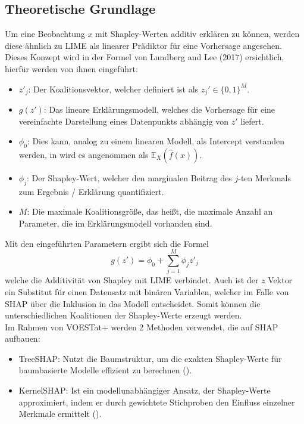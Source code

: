 \documentclass[12pt,titlepage,oneside]{book}
\begin{document}
\subsection*{Theoretische Grundlage}
Um eine Beobachtung $x$ mit Shapley-Werten additiv erklären zu können, werden diese ähnlich zu LIME als linearer Prädiktor für eine Vorhersage angesehen. Dieses Konzept wird in der Formel von Lundberg and Lee (2017) ersichtlich, hierfür werden von ihnen eingeführt:
\begin{itemize}
    \item $z'_j$: Der Koalitionsvektor, welcher definiert ist als $z_j' \in \{0, 1\}^M$.
    \item $g(z')$: Das lineare Erklärungsmodell, welches die Vorhersage für eine vereinfachte Darstellung eines Datenpunkts abhängig von $z'$ liefert.
    \item $\phi_0$: Dies kann, analog zu einem linearen Modell, als Intercept verstanden werden, in \cite{molnar2020interpretable} wird es angenommen als $\mathbb{E}_X\left(\hat{f}(x)\right)$.
    \item $\phi_j$: Der Shapley-Wert, welcher den marginalen Beitrag des $j$-ten Merkmals zum Ergebnis / Erklärung quantifiziert.
    \item $M$: Die maximale Koalitionsgröße, das heißt, die maximale Anzahl an Parameter, die im Erklärungsmodell vorhanden sind.
\end{itemize}
Mit den eingeführten Parametern ergibt sich die Formel
\begin{equation}
    g(z') = \phi_0 + \sum_{j=1}^{M} \phi_j z'_j
\end{equation}
welche die Additivität von Shapley mit LIME verbindet. Auch ist der $z$ Vektor ein Substitut für einen Datensatz mit binären Variablen, welcher im Falle von SHAP über die Inklusion in das Modell entscheidet. Somit können die unterschiedlichen Koalitionen der Shapley-Werte erzeugt werden.\\

Im Rahmen von VOESTat+ werden 2 Methoden verwendet, die auf SHAP aufbauen:
\begin{itemize}
    \item TreeSHAP: Nutzt die Baumstruktur, um die exakten Shapley-Werte für baumbasierte Modelle effizient zu berechnen (\cite{lundberg2018consistent}).
    \item KernelSHAP: Ist ein modellunabhängiger Ansatz, der Shapley-Werte approximiert, indem er durch gewichtete Stichproben den Einfluss einzelner Merkmale ermittelt (\cite{lundberg2017unified}).
\end{itemize}
\end{document}
